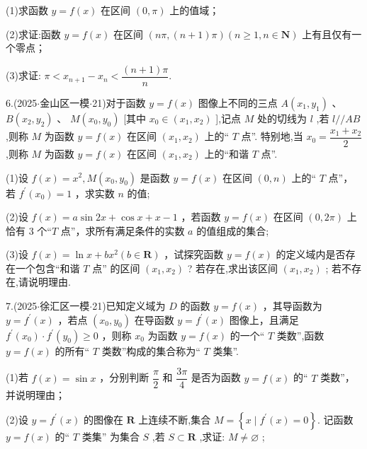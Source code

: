 (1)求函数 $y = f\left( x\right)$ 在区间 $\left( {0,\pi }\right)$ 上的值域；

(2)求证:函数 $y = f\left( x\right)$ 在区间 $\left( {{n\pi },\left( {n + 1}\right) \pi }\right) \left( {n \geq  1,n \in  \mathbf{N}}\right)$ 上有且仅有一个零点；

(3)求证: $\pi  < {x}_{n + 1} - {x}_{n} < \dfrac{\left( {n + 1}\right) \pi }{n}$.

6.(2025$\cdot$金山区一模$\cdot$21)对于函数 $y = f\left( x\right)$ 图像上不同的三点 $A\left( {{x}_{1},{y}_{1}}\right)$ 、 $B\left( {{x}_{2},{y}_{2}}\right)$ 、 $M\left( {{x}_{0},{y}_{0}}\right)$ [其中 ${x}_{0} \in  \left( {{x}_{1},{x}_{2}}\right)$ ],记点 $M$ 处的切线为 $l$ ,若 $l//{AB}$ ,则称 $M$ 为函数 $y = f\left( x\right)$ 在区间 $\left( {{x}_{1},{x}_{2}}\right)$ 上的“ $T$ 点”. 特别地,当 ${x}_{0} = \dfrac{{x}_{1} + {x}_{2}}{2}$ ,则称 $M$ 为函数 $y = f\left( x\right)$ 在区间 $\left( {{x}_{1},{x}_{2}}\right)$ 上的“和谐 $T$ 点”.

(1)设 $f\left( x\right)  = {x}^{2},M\left( {{x}_{0},{y}_{0}}\right)$ 是函数 $y = f\left( x\right)$ 在区间 $\left( {0,n}\right)$ 上的“ $T$ 点”，若 ${f}^{\prime }\left( {x}_{0}\right)  = 1$ ，求实数 $n$ 的值;

(2)设 $f\left( x\right)  = a\sin {2x} + \cos x + x - 1$ ，若函数 $y = f\left( x\right)$ 在区间 $\left( {0,{2\pi }}\right)$ 上恰有 3 个“$T$ 点”，求所有满足条件的实数 $a$ 的值组成的集合;

(3)设 $f\left( x\right)  = \ln x + b{x}^{2}\left( {b \in  \mathbf{R}}\right)$ ，试探究函数 $y = f\left( x\right)$ 的定义域内是否存在一个包含“和谐 $T$ 点” 的区间 $\left( {{x}_{1},{x}_{2}}\right)$ ? 若存在,求出该区间 $\left( {{x}_{1},{x}_{2}}\right)$ ; 若不存在,请说明理由.

7.(2025$\cdot$徐汇区一模$\cdot$21)已知定义域为 $D$ 的函数 $y = f\left( x\right)$ ，其导函数为 $y = {f}^{\prime }\left( x\right)$ ，若点 $\left( {{x}_{0},{y}_{0}}\right)$ 在导函数 $y = {f}^{\prime }\left( x\right)$ 图像上，且满足 ${f}^{\prime }\left( {x}_{0}\right)  \cdot  {f}^{\prime }\left( {y}_{0}\right)  \geq  0$ ，则称 ${x}_{0}$ 为函数 $y = f\left( x\right)$ 的一个“ $T$ 类数”,函数 $y = f\left( x\right)$ 的所有“ $T$ 类数”构成的集合称为“ $T$ 类集”.

(1)若 $f\left( x\right)  = \sin x$ ，分别判断 $\dfrac{\pi }{2}$ 和 $\dfrac{3\pi }{4}$ 是否为函数 $y = f\left( x\right)$ 的“ $T$ 类数”，并说明理由；

(2)设 $y = {f}^{\prime }\left( x\right)$ 的图像在 $\mathbf{R}$ 上连续不断,集合 $M = \left\{  {x \mid  {f}^{\prime }\left( x\right)  = 0}\right\}$. 记函数 $y = f\left( x\right)$ 的“ $T$ 类集” 为集合 $S$ ,若 $S \subset  \mathbf{R}$ ,求证: $M \neq  \varnothing$ ;

